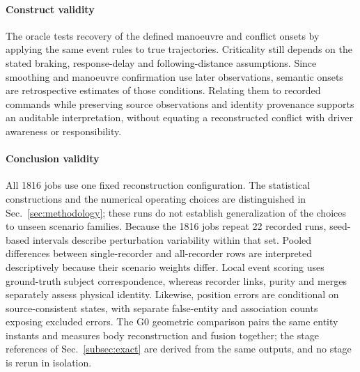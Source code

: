 \paragraph{Construct validity}
The oracle tests recovery of the defined manoeuvre and conflict onsets
by applying the same event rules to true trajectories. Criticality still
depends on the stated braking, response-delay and following-distance
assumptions. Since smoothing and manoeuvre confirmation use later
observations, semantic onsets are retrospective
estimates of those conditions. Relating them to recorded commands while
preserving source observations and identity provenance supports an
auditable interpretation, without equating a reconstructed conflict with
driver awareness or responsibility.

\paragraph{Conclusion validity}
All 1816 jobs use one fixed reconstruction configuration. The
statistical constructions and the numerical operating choices are
distinguished in Sec.~\ref{sec:methodology}; these runs do not establish
generalization of the choices to unseen scenario families.
Because the 1816 jobs repeat 22 recorded runs,
seed-based intervals describe perturbation variability within that set. Pooled differences
between single-recorder and all-recorder rows are interpreted
descriptively because their scenario weights differ. Local event scoring
uses ground-truth subject correspondence, whereas recorder links,
purity and merges separately assess physical identity. Likewise,
position errors are conditional on source-consistent states, with
separate false-entity and association counts exposing excluded errors.
The G0 geometric comparison pairs the same entity instants and measures
body reconstruction and fusion together; the stage references of
Sec.~\ref{subsec:exact} are derived from the same outputs, and no stage
is rerun in isolation.
